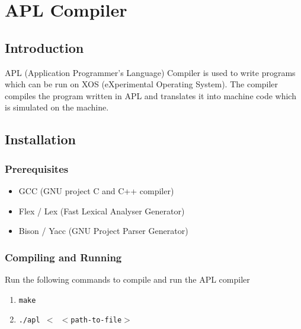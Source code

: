 \documentclass[11pt]{report}
\begin{document}
\chapter{APL Compiler}

\section{Introduction}
APL (Application Programmer's Language) Compiler is used to write programs which can be run on XOS (eXperimental Operating System). The compiler compiles the program written in APL and translates it into machine code which is simulated on the machine.

\section{Installation}

\subsection{Prerequisites}
\begin{itemize}
	\item GCC  (GNU project C and C++ compiler)
	\item Flex / Lex  (Fast Lexical Analyser Generator)
	\item Bison / Yacc  (GNU Project Parser Generator)
\end{itemize} 


\subsection{Compiling and Running}
Run the following commands to compile and run the APL compiler
\begin{enumerate}
		\item \texttt{make}
		\item \texttt{./apl $<$ $<$path-to-file$>$ }
\end{enumerate}
\end{document}
